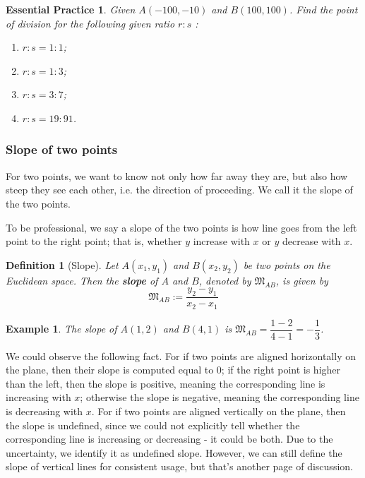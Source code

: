 \documentclass[12pt]{article}
\newtheorem{definition}{Definition}[section]
\newtheorem*{example}{Example}
\newtheorem{exercise}{Essential Practice}[subsection]
\begin{document}
    \begin{exercise}
        Given $A(-100,-10)$ and $B(100,100)$. Find the point of division for the following given ratio $r:s$ :\begin{enumerate}
            \item $r:s=1:1$;
            \item $r:s=1:3$;
            \item $r:s=3:7$;
            \item $r:s=19:91$.
        \end{enumerate}
    \end{exercise}

    \subsubsection*{Slope of two points}

    For two points, we want to know not only how far away they are, but also how steep they see each other, i.e. the direction of proceeding. We call it the slope of the two points.

    To be professional, we say a slope of the two points is how line goes from the left point to the right point; that is, whether $y$ increase with $x$ or $y$ decrease with $x$.

    \begin{definition}[Slope]
        Let $A(x_1,y_1)$ and $B(x_2,y_2)$ be two points on the Euclidean space. Then the \textbf{slope} of $A$ and $B$, denoted by $\mathfrak{M}_{AB}$, is given by $$\mathfrak{M}_{AB}:=\frac{y_2-y_1}{x_2-x_1}$$
    \end{definition}

    \begin{example}
        The slope of $A(1,2)$ and $B(4,1)$ is $\mathfrak{M}_{AB}=\dfrac{1-2}{4-1}=-\dfrac{1}{3}$.
    \end{example}

    We could observe the following fact. For if two points are aligned horizontally on the plane, then their slope is computed equal to 0; if the right point is higher than the left, then the slope is positive, meaning the corresponding line is increasing with $x$; otherwise the slope is negative, meaning the corresponding line is decreasing with $x$. For if two points are aligned vertically on the plane, then the slope is undefined, since we could not explicitly tell whether the corresponding line is increasing or decreasing - it could be both. Due to the uncertainty, we identify it as undefined slope. However, we can still define the slope of vertical lines for consistent usage, but that's another page of discussion.
\end{document}
